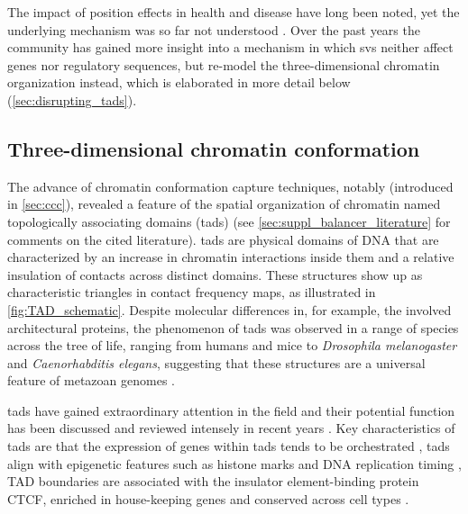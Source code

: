 The impact of position effects in health and disease have long been noted, yet
the underlying mechanism was so far not understood \citep{Kleinjan2005}.
Over the past years the community has gained more insight into a mechanism in which
\acp{sv} neither affect genes nor regulatory sequences, but re-model the
three-dimensional chromatin organization instead, which is elaborated in more
detail below (\cref{sec:disrupting_tads}).




\subsection{Three-dimensional chromatin conformation}
\label{sec:chromatin_conformation}


The advance of chromatin conformation capture techniques, notably \hic
(introduced in \cref{sec:ccc}), revealed a feature of the spatial organization
of chromatin named topologically associating domains (\acp{tad})
\citep{Dixon2012,Nora2012,Sexton2012,Rao2014} (see
\cref{sec:suppl_balancer_literature} for comments on the cited literature).
\Acp{tad} are physical domains of
DNA that are characterized by an increase in chromatin interactions inside them
and a relative insulation of contacts across distinct domains. These structures
show up as characteristic triangles in contact frequency maps, as illustrated in
\cref{fig:TAD_schematic}. Despite molecular differences in, for example,
the involved architectural proteins, the phenomenon of \acp{tad} was observed in
a range of species across the tree of life, ranging from humans and mice to
\textit{Drosophila melanogaster} and \textit{Caenorhabditis elegans}, suggesting
that these structures are a universal feature of metazoan genomes
\citep{Dekker2015}.

\Acp{tad} have gained extraordinary attention in the field and their potential
function has been discussed and reviewed intensely in recent years
\citep[among others]{Gibcus2013,Gorkin2014,Sexton2015b,Hnisz2016a,Ruiz-Velasco2017}.
Key characteristics of \acp{tad} are that the expression of genes within
\acp{tad} tends to be orchestrated \citep[see figure 4b]{LeDily2014,Nora2012},
\acp{tad} align with epigenetic features such as histone marks \citep{Nora2012}
and DNA replication timing \citep{Pope2014,LeDily2014}, TAD boundaries are
associated with the insulator element-binding protein CTCF, enriched in
house-keeping genes and conserved across cell types
\citep{Dixon2012,Rao2014,Schmitt2016}.

